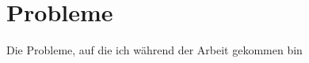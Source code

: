 















\section{Probleme}\label{Probleme}
Die Probleme, auf die ich während der Arbeit gekommen bin\\
